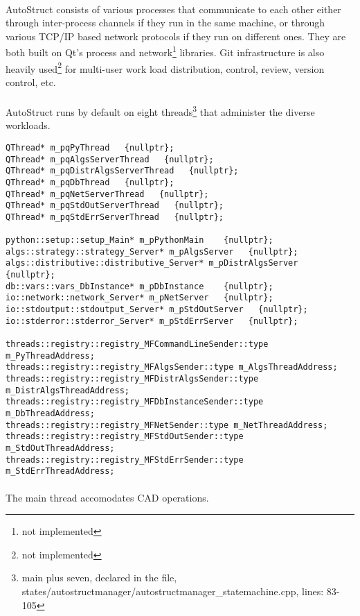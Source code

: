 \paragraph{}
AutoStruct consists of various processes that communicate to each other either through inter-process channels if they run in the same machine, or through various TCP/IP based network protocols if they run on different ones. They are both built on Qt's process and network\footnote{not implemented} libraries. Git infrastructure is also heavily used\footnote{not implemented} for multi-user work load distribution, control, review, version control, etc.
\paragraph{}
AutoStruct runs by default on eight threads\footnote{main plus seven, declared in the file, states/autostructmanager/autostructmanager\_statemachine.cpp, lines: 83-105} that administer the diverse workloads.
\begin{verbatim}
QThread* m_pqPyThread   {nullptr};
QThread* m_pqAlgsServerThread   {nullptr};
QThread* m_pqDistrAlgsServerThread   {nullptr};
QThread* m_pqDbThread   {nullptr};
QThread* m_pqNetServerThread   {nullptr};
QThread* m_pqStdOutServerThread   {nullptr};
QThread* m_pqStdErrServerThread   {nullptr};

python::setup::setup_Main* m_pPythonMain    {nullptr};
algs::strategy::strategy_Server* m_pAlgsServer   {nullptr};
algs::distributive::distributive_Server* m_pDistrAlgsServer   {nullptr};
db::vars::vars_DbInstance* m_pDbInstance    {nullptr};
io::network::network_Server* m_pNetServer   {nullptr};
io::stdoutput::stdoutput_Server* m_pStdOutServer   {nullptr};
io::stderror::stderror_Server* m_pStdErrServer   {nullptr};

threads::registry::registry_MFCommandLineSender::type m_PyThreadAddress;
threads::registry::registry_MFAlgsSender::type m_AlgsThreadAddress;
threads::registry::registry_MFDistrAlgsSender::type m_DistrAlgsThreadAddress;
threads::registry::registry_MFDbInstanceSender::type m_DbThreadAddress;
threads::registry::registry_MFNetSender::type m_NetThreadAddress;
threads::registry::registry_MFStdOutSender::type m_StdOutThreadAddress;
threads::registry::registry_MFStdErrSender::type m_StdErrThreadAddress;
\end{verbatim}
\paragraph{}
The main thread accomodates CAD operations.
